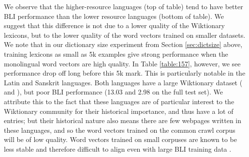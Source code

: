 \documentclass[11pt]{article}
\begin{document}
We observe that the higher-resource languages (top of table) tend to have better BLI performance than the lower resource languages (bottom of table).
We suggest that this difference is not due to a lower quality of the Wiktionary lexicons,
but to the lower quality of the \citet{grave2018learning} word vectors trained on smaller datasets.
We note that in our dictionary size experiment from Section \ref{sec:dictsize} above,
training lexicons as small as 5k examples give strong performance when the monolingual word vectors are high quality.
In Table \ref{table:157}, however, we see performance drop off long before this 5k mark.
This is particularly notable in the Latin and Sanskrit languages.
Both languages have a large Wiktionary dataset ( and ),
but poor BLI performance (13.03 and 2.98 on the full test set).
We attribute this to the fact that these languages are of particular interest to the Wiktionary community for their historical importance, and thus have a lot of entries;
but their historical nature also means there are few webpages written in these languages,
and so the word vectors trained on the common crawl corpus will be of low quality.
Word vectors trained on small corpuses are known to be less stable \citep{pierrejean2018towards,
wendlandt2018factors,leszczynski2020understanding,burdick2020analyzing} and therefore difficult to align even with large BLI training data \citep{vulic2020all}.

\end{document}
